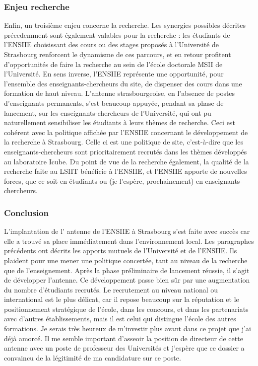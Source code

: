 \documentclass[11pt]{article}
\begin{document}
\subsubsection*{Enjeu recherche}
Enfin,  un  troisième  enjeu  concerne la  recherche.  Les  synergies  possibles
décrites précedemment sont également valables  pour la recherche : les étudiants
de  l'ENSIIE choisissant  des cours  ou des  stages proposés  à l'Université  de
Strasbourg  renforcent le  dynamisme de  ces  parcours, et  en retour  profitent
d'opportunités  de faire  la  recherche au  sein de  l'école  doctorale MSII  de
l'Université.  En  sens  inverse,  l'ENSIIE  représente  une  opportunité,  pour
l'ensemble des enseignants-chercheurs  du site, de dispenser des  cours dans une
formation  de haut  niveau. L'antenne  strasbourgeoise, en  l'absence de  postes
d'enseignants permanents, s'est beaucoup appuyée, pendant sa phase de lancement,
sur  les  enseignants-chercheurs  de  l'Université,  qui  ont  pu  naturellement
sensibiliser les étudiants  à leurs thèmes de recherche. Ceci  est cohérent avec
la politique affichée par l'ENSIIE concernant le développement de la recherche à
Strasbourg.   Celle  ci  est  une   politique  de  site,  c'est-à-dire  que  les
enseignants-chercheurs sont prioritairement recrutés  dans les thèmes développés
au laboratoire Icube.  Du point de vue  de la recherche également, la qualité de
la  recherche faite  au  LSIIT  bénéficie à  l'ENSIIE,  et  l'ENSIIE apporte  de
nouvelles forces,  que ce soit en  étudiants ou (je l'espère,  prochainement) en
enseignants-chercheurs.

 
\subsubsection*{Conclusion}
L'implantation de  l' antenne de l'ENSIIE  à Strasbourg s'est faite  avec succès
car  elle a  trouvé  sa  place immédiatement  dans  l'environnement local.   Les
paragraphes précédents  ont décrits  les apports mutuels  de l'Université  et de
l'ENSIIE. Ils plaident pour une mener une politique concertée, tant au niveau de
la recherche  que de  l'enseignement. Après la  phase préliminaire  de lancement
réussie, il s'agit de développer l'antenne.  Ce développement passe bien sûr par
une  augmentation du  nombre  d'étudiants recrutés.   Le  recrutement au  niveau
national ou  international est le  plus délicat, car  il repose beaucoup  sur la
réputation et  le positionnement stratégique  de l'école, dans les  concours, et
dans  les partenariats  avec  d'autres  établissements, mais  il  est celui  qui
distingue l'école des  autres formations.  Je serais très  heureux de m'investir
plus avant dans ce projet que j'ai déjà amorcé. Il me semble important d'asseoir
la  position de  directeur de  cette  antenne avec  un poste  de professeur  des
Universités  et j'espère  que ce  dossier  a convaincu  de la  légitimité de  ma
candidature sur ce poste.
\end{document}
